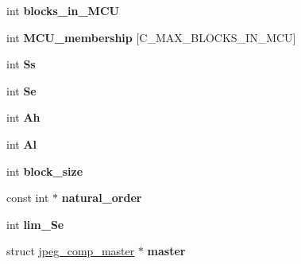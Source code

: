\begin{DoxyCompactItemize}
\item 
\hypertarget{structjpeg__compress__struct_ac32cf016a916984f68f158e5310a16bb}{int {\bfseries blocks\+\_\+in\+\_\+\+M\+C\+U}}\label{structjpeg__compress__struct_ac32cf016a916984f68f158e5310a16bb}

\item 
\hypertarget{structjpeg__compress__struct_a6debf977451892aae1116b47c5c1c95f}{int {\bfseries M\+C\+U\+\_\+membership} \mbox{[}C\+\_\+\+M\+A\+X\+\_\+\+B\+L\+O\+C\+K\+S\+\_\+\+I\+N\+\_\+\+M\+C\+U\mbox{]}}\label{structjpeg__compress__struct_a6debf977451892aae1116b47c5c1c95f}

\item 
\hypertarget{structjpeg__compress__struct_adda4b7ef0dda94b38b6e34df42769d81}{int {\bfseries Ss}}\label{structjpeg__compress__struct_adda4b7ef0dda94b38b6e34df42769d81}

\item 
\hypertarget{structjpeg__compress__struct_af2c1fe7c62791cda75219c10d71132d9}{int {\bfseries Se}}\label{structjpeg__compress__struct_af2c1fe7c62791cda75219c10d71132d9}

\item 
\hypertarget{structjpeg__compress__struct_a301a95efc904d22aca78592f7a21673a}{int {\bfseries Ah}}\label{structjpeg__compress__struct_a301a95efc904d22aca78592f7a21673a}

\item 
\hypertarget{structjpeg__compress__struct_a4160152697f6042b8fe1d6838a8118e2}{int {\bfseries Al}}\label{structjpeg__compress__struct_a4160152697f6042b8fe1d6838a8118e2}

\item 
\hypertarget{structjpeg__compress__struct_aad43e172d1ec5dd1e369b72ed8753410}{int {\bfseries block\+\_\+size}}\label{structjpeg__compress__struct_aad43e172d1ec5dd1e369b72ed8753410}

\item 
\hypertarget{structjpeg__compress__struct_a40fe112672c5c26f6bc53978a2b9a2a1}{const int $\ast$ {\bfseries natural\+\_\+order}}\label{structjpeg__compress__struct_a40fe112672c5c26f6bc53978a2b9a2a1}

\item 
\hypertarget{structjpeg__compress__struct_acb8a6365a8225a8d14d88b5d3c1d03c3}{int {\bfseries lim\+\_\+\+Se}}\label{structjpeg__compress__struct_acb8a6365a8225a8d14d88b5d3c1d03c3}

\item 
\hypertarget{structjpeg__compress__struct_a50b9c60f47c9fff393d7d5b3a7b3618e}{struct \hyperlink{structjpeg__comp__master}{jpeg\+\_\+comp\+\_\+master} $\ast$ {\bfseries master}}\label{structjpeg__compress__struct_a50b9c60f47c9fff393d7d5b3a7b3618e}


\end{DoxyCompactItemize}
